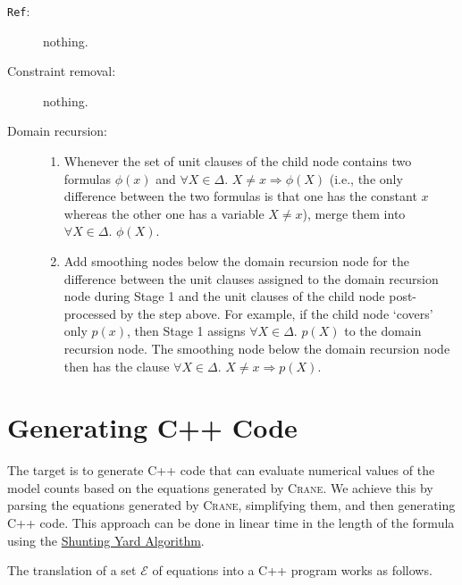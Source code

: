 \documentclass{article}
\theoremstyle{definition}
\begin{document}
\begin{description}
  \item[\texttt{Ref}:] nothing.
  \item[Constraint removal:] nothing.
  \item[Domain recursion:]
        \begin{enumerate}
          \item Whenever the set of unit clauses of the child node contains two
                formulas $\phi(x)$ and $\forall X \in \Delta\text{.
                } X \ne x \Rightarrow \phi(X)$ (i.e., the only difference
                between the two formulas is that one has the constant $x$
                whereas the other one has a variable $X \ne x$), merge them into
                $\forall X \in \Delta\text{. }\phi(X)$.
          \item Add smoothing nodes below the domain recursion node for the
                difference between the unit clauses assigned to the domain
                recursion node during Stage 1 and the unit clauses of the child
                node post-processed by the step above. For example, if the child
                node `covers' only $p(x)$, then Stage 1 assigns
                $\forall X \in \Delta\text{. }p(X)$ to the domain recursion
                node. The smoothing node below the domain recursion node then
                has the clause $\forall X \in \Delta\text{.
                } X \ne x \Rightarrow p(X)$.
        \end{enumerate}
\end{description}


\section{Generating C++ Code}\label{sec:cpp}

The target is to generate C++ code that can evaluate numerical values of the
model counts based on the equations generated by \textsc{Crane}. We achieve this
by parsing the equations generated by \textsc{Crane}, simplifying them, and then
generating C++ code. This approach can be done in linear time in the length of
the formula using
the
\href{https://en.wikipedia.org/wiki/Shunting_yard_algorithm#:~:text=In%20computer%20science%2C%20the%20shunting,abstract%20syntax%20tree%20(AST).}{Shunting
  Yard Algorithm}.

The translation of a set $\mathcal{E}$ of equations into a C++ program works as
follows.
\end{document}
